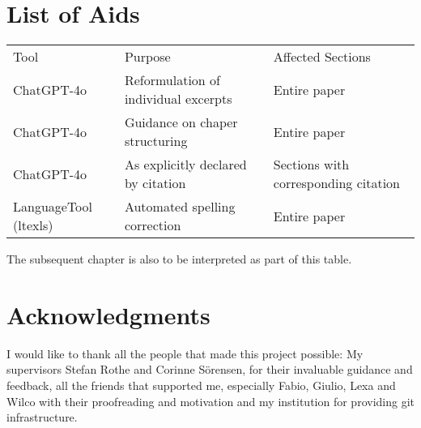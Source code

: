 \chapter*{List of Aids}
\begin{table}[H]
    \begin{tabular}{lll}
        Tool & Purpose & Affected Sections \\
        ChatGPT-4o & Reformulation of individual excerpts & Entire paper \\
        ChatGPT-4o & Guidance on chaper structuring & Entire paper \\
        ChatGPT-4o & As explicitly declared by citation & Sections with corresponding citation \\
        LanguageTool (ltexls) & Automated spelling correction & Entire paper \\
    \end{tabular}

\end{table}
The subsequent chapter is also to be interpreted as part of this table.

\begingroup
\renewcommand{\cleardoublepage}{}
\renewcommand{\clearpage}{}
\chapter*{Acknowledgments}\label{chap:ack}
\endgroup
I would like to thank all the people that made this project possible: My supervisors Stefan Rothe and Corinne Sörensen, for their invaluable guidance and feedback, all the friends that supported me, especially Fabio, Giulio, Lexa and Wilco with their proofreading and motivation and my institution for providing git infrastructure.
